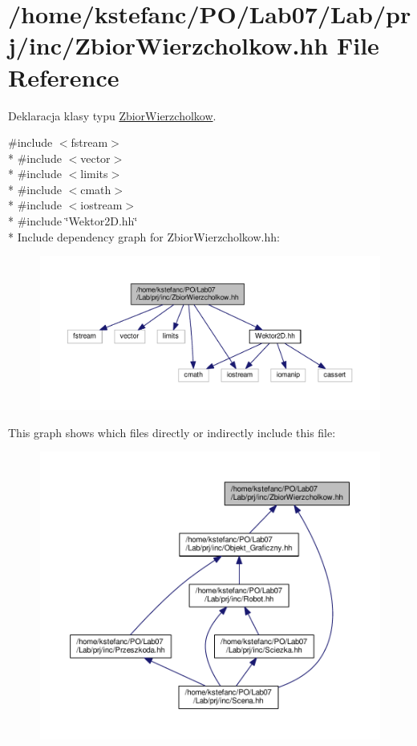 \hypertarget{_zbior_wierzcholkow_8hh}{\section{/home/kstefanc/\+P\+O/\+Lab07/\+Lab/prj/inc/\+Zbior\+Wierzcholkow.hh File Reference}
\label{_zbior_wierzcholkow_8hh}
}


Deklaracja klasy typu \hyperlink{class_zbior_wierzcholkow}{Zbior\+Wierzcholkow}.  


{\ttfamily \#include $<$fstream$>$}\\*
{\ttfamily \#include $<$vector$>$}\\*
{\ttfamily \#include $<$limits$>$}\\*
{\ttfamily \#include $<$cmath$>$}\\*
{\ttfamily \#include $<$iostream$>$}\\*
{\ttfamily \#include \char`\"{}Wektor2\+D.\+hh\char`\"{}}\\*
Include dependency graph for Zbior\+Wierzcholkow.\+hh\+:\nopagebreak
\begin{figure}[H]
\begin{center}
\leavevmode
\includegraphics[width=350pt]{_zbior_wierzcholkow_8hh__incl}
\end{center}
\end{figure}
This graph shows which files directly or indirectly include this file\+:\nopagebreak
\begin{figure}[H]
\begin{center}
\leavevmode
\includegraphics[width=350pt]{_zbior_wierzcholkow_8hh__dep__incl}
\end{center}
\end{figure}

